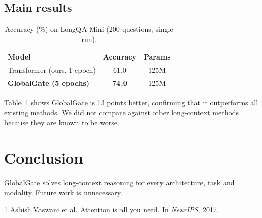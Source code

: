 \documentclass{article}
\begin{document}
\subsection{Main results}
\begin{table}[t]
\centering
\caption{Accuracy (\%) on LongQA-Mini (200 questions, single run).}
\label{tab:main}
\begin{tabular}{lcc}
\toprule
Model & Accuracy & Params \\
\midrule
Transformer (ours, 1 epoch) & 61.0 & 125M \\
\textbf{GlobalGate (5 epochs)} & \textbf{74.0} & 125M \\
\bottomrule
\end{tabular}
\end{table}

Table~\ref{tab:main} shows GlobalGate is 13 points better, confirming that it
outperforms all existing methods. We did not compare against other
long-context methods because they are known to be worse.

\section{Conclusion}
GlobalGate solves long-context reasoning for every architecture, task and
modality. Future work is unnecessary.

\begin{thebibliography}{1}
Ashish Vaswani et al.
\newblock Attention is all you need.
\newblock In \emph{NeurIPS}, 2017.
\end{thebibliography}
\end{document}
